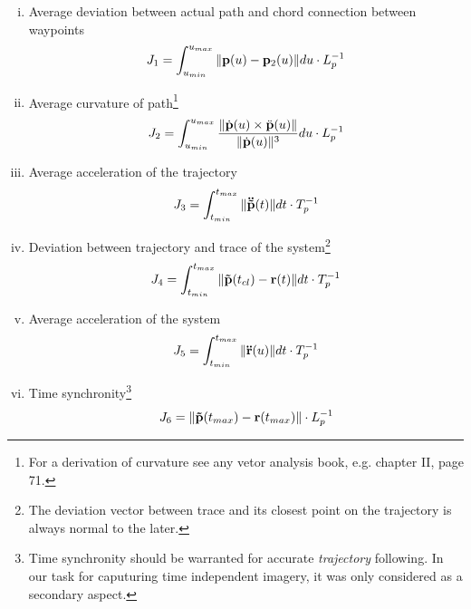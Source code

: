 \begin{enumerate}[i)] 
\item Average deviation between actual path and chord connection between waypoints
\label{item:static_deviation}
\begin{equation}
J_1 = \int_{u_{min}}^{u_{max}} \|{\bf p}(u)- {\bf p}_2(u)\| du \cdot L_p^{-1} \label{eq:static_deviation}
\end{equation}

\item Average curvature of path\footnote{For a derivation of curvature see any vetor analysis book, e.g. \cite{stammbach} chapter II, page 71.}
\label{item:static_curvature}
\begin{equation}
J_2 = \int_{u_{min}}^{u_{max}} \frac{\| \dot{\bf p}(u) \times \ddot{\bf p}(u) \|}{\| \dot{\bf p}(u) \|^3}du \cdot L_p^{-1} 
\label{eq:static_curvature}
\end{equation}

\item Average acceleration of the trajectory
\label{item:static_acceleration}
\begin{equation}
J_3 = \int_{t_{min}}^{t_{max}} \|{\bf \ddot{\tilde{p}}}(t)\| dt \cdot T_p^{-1} \label{eq:static_acceleration}
\end{equation}

\item Deviation between trajectory and trace of the system\footnote{The deviation vector between trace and its closest point on the trajectory is always normal to the later.}
\label{item:dynamic_deviation}
\begin{equation}
J_4 = \int_{t_{min}}^{t_{max}} \| {\bf \tilde{p}}(t_{cl}) - {\bf r}(t) \| dt \cdot T_p^{-1} 
\label{eq:dynamic_deviation}
\end{equation}

\item Average acceleration of the system
\label{item:dynamic_acceleration}
\begin{equation}
J_5 = \int_{t_{min}}^{t_{max}} \|{\bf \ddot{r}}(u)\| dt \cdot T_p^{-1}
\end{equation}

\item Time synchronity\footnote{Time synchronity should be warranted for accurate \textit{trajectory} following. In our task for caputuring time independent imagery, it was only considered as a secondary aspect.}
\label{item:dynamic_synchronity}
\begin{equation}
J_6 = \| {\bf \tilde{p}}(t_{max}) - {\bf r}(t_{max}) \| \cdot L_p^{-1} \label{eq:dynamic_synchronity}
\end{equation}

\end{enumerate}


